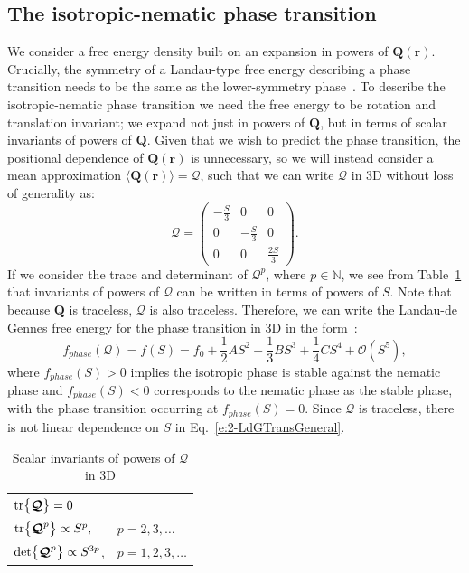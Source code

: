 \subsection{The isotropic-nematic phase transition}
We consider a free energy density built on an expansion in powers of $\mathbf{Q}(\mathbf{r})$.
Crucially, the symmetry of a Landau-type free energy describing a phase transition needs to be the same as the lower-symmetry phase~\cite{RN33,RN175}.
To describe the isotropic-nematic phase transition we need the free energy to be rotation and translation invariant; we expand not just in powers of $\mathbf{Q}$, but in terms of scalar invariants of powers of $\mathbf{Q}$.
Given that we wish to predict the phase transition, the positional dependence of $\mathbf{Q}(\mathbf{r})$ is unnecessary, so we will instead consider a mean approximation $\langle \mathbf{Q}(\mathbf{r}) \rangle = \bm{\mathcal{Q}}$, such that we can write $\bm{\mathcal{Q}}$ in 3D without loss of generality as:
\begin{equation}
  \bm{\mathcal{Q}} =
    \begin{pmatrix}
        -\frac{S}{3} & 0 & 0 \\
        0 & -\frac{S}{3} & 0 \\
        0 & 0 & \frac{2S}{3}
    \end{pmatrix}.
\end{equation}
If we consider the trace and determinant of $\bm{\mathcal{Q}}^p$, where $p \in \mathbb{N}$, we see from Table~\ref{t:2-powersQ} that invariants of powers of $\bm{\mathcal{Q}}$ can be written in terms of powers of $S$.
Note that because $\mathbf{Q}$ is traceless, $\bm{\mathcal{Q}}$ is also traceless.
Therefore, we can write the Landau-de Gennes free energy for the phase transition in 3D in the form~\cite{RN33,RN175}:
\begin{equation}
  f_{phase}(\bm{\mathcal{Q}}) = f(S) = f_0 + \frac{1}{2}A S^2 + \frac{1}{3}B S^3 + \frac{1}{4}C S^4 + \mathcal{O} \left (S^5 \right ),\label{e:2-LdGTransGeneral}
\end{equation}
where $f_{phase}(S) > 0$ implies the isotropic phase is stable against the nematic phase and $f_{phase}(S) < 0$ corresponds to the nematic phase as the stable phase, with the phase transition occurring at $f_{phase}(S) = 0$. Since $\bm{\mathcal{Q}}$ is traceless, there is not linear dependence on $S$ in Eq.~\ref{e:2-LdGTransGeneral}.
\begin{table}[t]
  \centering
  \caption{Scalar invariants of powers of $\bm{\mathcal{Q}}$ in 3D}
  \label{t:2-powersQ}
  \begin{tabular}{|l l|}
    \hline
    $\textup{tr} \big \{ \bm{\mathcal{Q}} \big \} = 0$ & \\
    $\textup{tr} \big \{ \bm{\mathcal{Q}}^p \big \} \propto S^p,$ & $p = 2,3, \dots$ \\
    $\textup{det} \big \{ \bm{\mathcal{Q}}^p \big \} \propto S^{3p}$, & $p = 1,2,3,\dots$ \\
    \hline
  \end{tabular}
\end{table}
